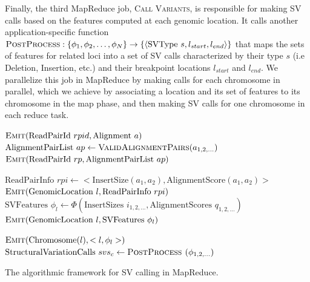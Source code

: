 \documentclass [11pt] {report}
\begin{document}
Finally, the third MapReduce job, \textsc{Call Variants}, is responsible for making SV calls based on the features computed at each genomic location. It calls another application-specific function  $\textsc{PostProcess} : \left\{\phi_1,\phi_2,\ldots,\phi_N\right\} \rightarrow \left\{\langle  \textrm{SVType } s, l_{start}, l_{end} \rangle\right\}$  that maps the sets of features for related loci into a set of SV calls characterized by their type $s$ (i.e Deletion, Insertion, etc.) and their breakpoint locations $l_{start}$ and $l_{end}$. We parallelize this job in MapReduce by making calls for each chromosome in parallel, which we achieve by associating a location and its set of features to its chromosome in the map phase, and then making SV calls for one chromosome in each reduce task.

\begin{algorithm}[h]
\algrenewcommand{}
 \begin{algorithmic}[1]
 \State $\textsc{Emit}(\textrm{ReadPairId }rpid, \textrm{Alignment }a)$
 \EndFor
 \EndFunction
 \State $\textrm{AlignmentPairList }ap \gets \textsc{ValidAlignmentPairs}(a_{1,2,\ldots})$
 \State $\textsc{Emit}(\textrm{ReadPairId }rp, \textrm{AlignmentPairList } ap)$
 \EndFunction
 \EndProcedure

 \State $ \textrm{ReadPairInfo }rpi \gets <\textrm{InsertSize}(a_1,a_2), \textrm{AlignmentScore}(a_1,a_2)>$
 \State $\textsc{Emit}(\textrm{GenomicLocation }l, \textrm{ReadPairInfo }rpi)$
 \EndFor
 \EndFor
 \EndFunction
 \State $\textrm{SVFeatures } \phi_l \gets \Phi(\textrm{InsertSizes }i_{1,2,\ldots}, \textrm{AlignmentScores }q_{1,2,\ldots})$
 \State $\textsc{Emit}(\textrm{GenomicLocation }l, \textrm{SVFeatures } \phi_l)$
 \EndFunction
 \EndProcedure

 \State $\textsc{Emit}(\textrm{Chromosome}(l), <l,\phi_l>)$
 \EndFunction
 \State $\textrm{StructuralVariationCalls } svs_c \gets \textsc{PostProcess }(\phi_{1,2,\ldots})$
 \EndFunction
 \EndProcedure
 \end{algorithmic}
\caption{The algorithmic framework for SV calling in MapReduce.}
\label{cb_algo}
\end{algorithm}
\end{document}
